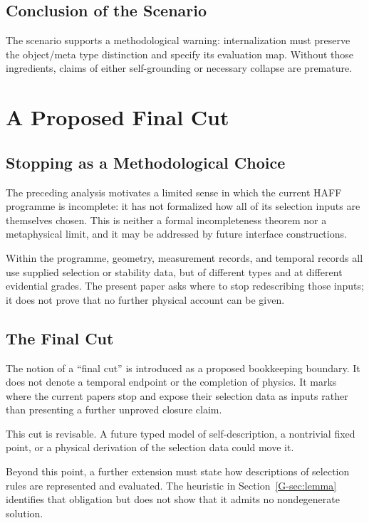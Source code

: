 \documentclass[12pt,a4paper,openany]{book}
\begin{document}
\subsection{Conclusion of the Scenario}

The scenario supports a methodological warning: internalization must preserve the object/meta type distinction and specify its evaluation map.  Without those ingredients, claims of either self-grounding or necessary collapse are premature.

\section{A Proposed Final Cut}
\label{G-sec:cut}

\subsection{Stopping as a Methodological Choice}

The preceding analysis motivates a limited sense in which the current HAFF programme is incomplete: it has not formalized how all of its selection inputs are themselves chosen.  This is neither a formal incompleteness theorem nor a metaphysical limit, and it may be addressed by future interface constructions.

Within the programme, geometry, measurement records, and temporal records all use supplied selection or stability data, but of different types and at different evidential grades.  The present paper asks where to stop redescribing those inputs; it does not prove that no further physical account can be given.

\subsection{The Final Cut}

The notion of a ``final cut'' is introduced as a proposed bookkeeping boundary. It does not denote a temporal endpoint or the completion of physics.  It marks where the current papers stop and expose their selection data as inputs rather than presenting a further unproved closure claim.

This cut is revisable.  A future typed model of self-description, a nontrivial fixed point, or a physical derivation of the selection data could move it.

Beyond this point, a further extension must state how descriptions of selection rules are represented and evaluated.  The heuristic in Section~\ref{G-sec:lemma} identifies that obligation but does not show that it admits no nondegenerate solution.
\end{document}
